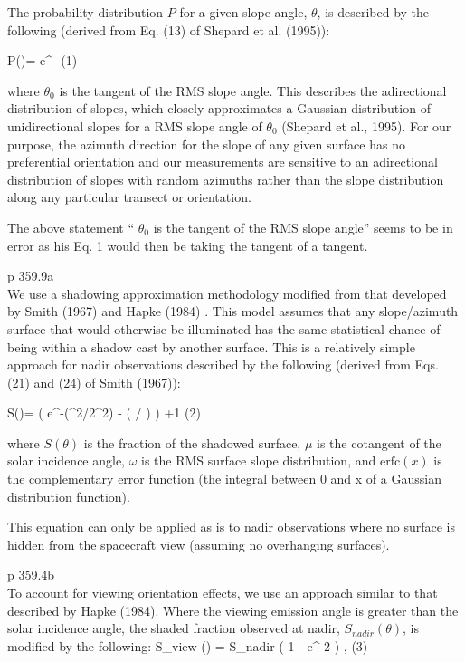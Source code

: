 \documentclass{article}
\newcommand{\erfc}{\mathrm{erfc}}  %
\begin{document}
The probability distribution $P$ for a given slope angle, $\theta$, is described
by the following (derived from Eq. (13) of Shepard et al. (1995)):

\qb P(\theta)= \cdot e^{- }  \qeq (1) \qe

where $\theta_0$ is the tangent of the RMS slope angle. This describes the
adirectional distribution of slopes, which closely approximates a
Gaussian distribution of unidirectional slopes for a RMS slope angle
of $\theta_0$ (Shepard et al., 1995). For our purpose, the azimuth direction
for the slope of any given surface has no preferential orientation
and our measurements are sensitive to an adirectional distribution
of slopes with random azimuths rather than the slope distribution
along any particular transect or orientation. \eq

The above statement `` $\theta_0$ is the tangent of the RMS slope angle'' seems to be in error as his Eq. 1 would then be taking the tangent of a tangent.

p 359.9a  \\ \bq 
We use a shadowing approximation methodology modified from that developed by
Smith (1967) and Hapke (1984) . This model assumes that any slope/azimuth
surface that would otherwise be illuminated has the same statistical chance of
being within a shadow cast by another surface. This is a relatively simple
approach for nadir observations described by the following (derived from
Eqs. (21) and (24) of Smith (1967)):

\qb S(\theta)=\frac{1-\frac{1}{2}  \erfc \left( \mu / \sqrt{2} \omega \right) }
{ \left(  \cdot \frac{\omega}{\mu} e^{-(\mu^2/2\omega^2)}
 - \erfc \left( \mu /  \omega \right) \right) +1 } \qeq (2) \qe

where $S(\theta)$ is the fraction of the shadowed surface, $\mu$ is the
cotangent of the solar incidence angle, $\omega$ is the RMS surface slope
distribution, and $\erfc(x)$ is the complementary error function (the integral
between 0 and x of a Gaussian distribution function).

This equation can only be applied as is to nadir observations where no surface
is hidden from the spacecraft view (assuming no overhanging surfaces). \eq



p 359.4b \\ 
 To account for viewing orientation effects, we use an approach similar to that
 described by Hapke (1984). Where the viewing emission angle is greater than
 the solar incidence angle, the shaded fraction observed at nadir,
$ S_{nadir} (\theta)$, is modified by the following:
\qb S_{view} (\theta) = S_{nadir} \cdot \left( 1 - e^{-2\tan {} } \right) , \qeq (3) \qe
\end{document}

